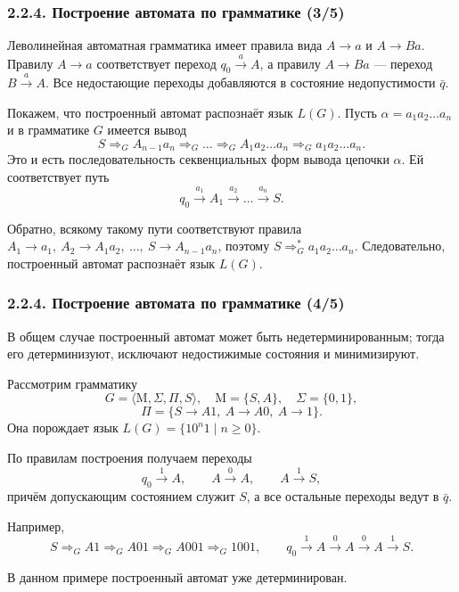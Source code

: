 \documentclass[mathserif,12pt,aspectratio=169]{beamer}
\let\ge\geqslant
\begin{document}
\begin{frame}
\frametitle{2.2.4. Построение автомата по грамматике (3/5)}

\begin{ground}
Леволинейная автоматная грамматика имеет правила вида
\(A\to a\) и \(A\to Ba\).
Правилу \(A\to a\) соответствует переход \(q_0\xrightarrow{a}A\),
а правилу \(A\to Ba\) --- переход \(B\xrightarrow{a}A\).
Все недостающие переходы добавляются в состояние недопустимости \(\bar q\).

Покажем, что построенный автомат распознаёт язык \(L(G)\).
Пусть \(\alpha=a_1a_2\dots a_n\) и в грамматике \(G\) имеется вывод
\[
S \Rightarrow_G A_{n-1}a_n \Rightarrow_G \dots
\Rightarrow_G A_1a_2\dots a_n \Rightarrow_G a_1a_2\dots a_n.
\]
Это и есть последовательность секвенциальных форм вывода цепочки \(\alpha\).
Ей соответствует путь
\[
q_0\xrightarrow{a_1}A_1\xrightarrow{a_2}\dots\xrightarrow{a_n}S.
\]

Обратно, всякому такому пути соответствуют правила
\(A_1\to a_1,\ A_2\to A_1a_2,\ \dots,\ S\to A_{n-1}a_n\),
поэтому \(S\Rightarrow_G^* a_1a_2\dots a_n\).
Следовательно, построенный автомат распознаёт язык \(L(G)\).
\end{ground}

\end{frame}

\begin{frame}
\frametitle{2.2.4. Построение автомата по грамматике (4/5)}
\small

\begin{remark}
В общем случае построенный автомат может быть недетерминированным;
тогда его детерминизуют, исключают недостижимые состояния и минимизируют.
\end{remark}

\begin{example}
Рассмотрим грамматику
\[
G=\langle \mathrm{M},\Sigma,\Pi,S\rangle,\quad
\mathrm{M}=\{S,A\},\quad
\Sigma=\{0,1\},
\]
\[
\Pi=\{S\to A1,\ A\to A0,\ A\to 1\}.
\]
Она порождает язык \(L(G)=\{10^n1\mid n\ge 0\}\).

По правилам построения получаем переходы
\[
q_0\xrightarrow{1}A,\qquad
A\xrightarrow{0}A,\qquad
A\xrightarrow{1}S,
\]
причём допускающим состоянием служит \(S\), а все остальные переходы ведут в \(\bar q\).

Например,
\[
S\Rightarrow_G A1\Rightarrow_G A01\Rightarrow_G A001\Rightarrow_G 1001,
\qquad
q_0\xrightarrow{1}A\xrightarrow{0}A\xrightarrow{0}A\xrightarrow{1}S.
\]
\end{example}

\begin{remark}
В данном примере построенный автомат уже детерминирован.
\end{remark}

\end{frame}
\end{document}
